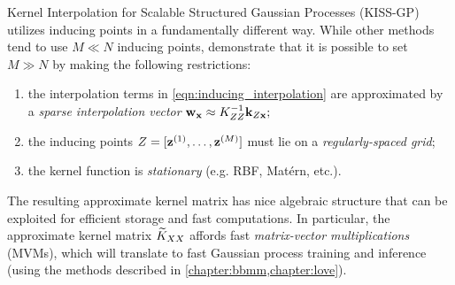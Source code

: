 Kernel Interpolation for Scalable Structured Gaussian Processes (KISS-GP) \cite{wilson2015kernel} utilizes inducing points in a fundamentally different way.
While other methods tend to use $M \ll N$ inducing points, \citet{wilson2015kernel} demonstrate that it is possible to set $M \gg N$ by making the following restrictions:
\begin{enumerate}
  \item the interpolation terms in \cref{eqn:inducing_interpolation} are approximated by a \emph{sparse interpolation vector} $\mathbf{w}_{\mathbf{x}} \approx K^{-1}_{ZZ} \mathbf{k}_{Z\mathbf{x}};$
  \item the inducing points $Z = [\mathbf{z}^{(1)}, \ldots, \mathbf{z}^{(M)}]$ must lie on a \emph{regularly-spaced grid};
  \item the kernel function is \emph{stationary} (e.g. RBF, Mat\'ern, etc.).
\end{enumerate}
The resulting approximate kernel matrix has nice algebraic structure that can be exploited for efficient storage and fast computations.
In particular, the approximate kernel matrix $\widetilde {K}_{XX}$ affords fast \emph{matrix-vector multiplications} (MVMs), which will translate to fast Gaussian process training and inference (using the methods described in \cref{chapter:bbmm,chapter:love}).

